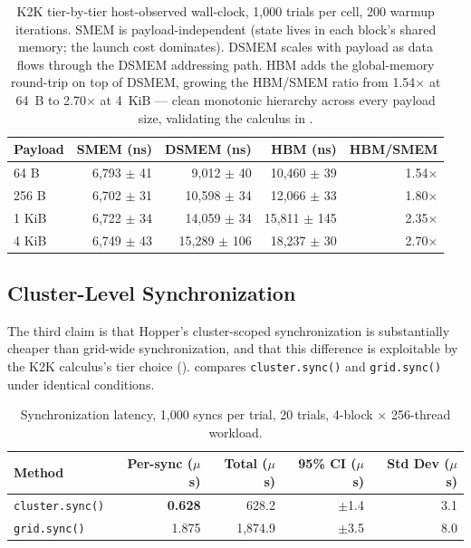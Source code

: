 \begin{table}[htbp]
\centering
\begin{tabular}{lrrrr}
\toprule
Payload & SMEM (ns) & DSMEM (ns) & HBM (ns) & HBM/SMEM \\
\midrule
64 B   & 6{,}793 $\pm$ 41 &  9{,}012 $\pm$ 40 & 10{,}460 $\pm$ 39 & 1.54$\times$ \\
256 B  & 6{,}702 $\pm$ 31 & 10{,}598 $\pm$ 34 & 12{,}066 $\pm$ 33 & 1.80$\times$ \\
1 KiB  & 6{,}722 $\pm$ 34 & 14{,}059 $\pm$ 34 & 15{,}811 $\pm$ 145 & 2.35$\times$ \\
4 KiB  & 6{,}749 $\pm$ 43 & 15{,}289 $\pm$ 106 & 18{,}237 $\pm$ 30 & 2.70$\times$ \\
\bottomrule
\end{tabular}
\caption{K2K tier-by-tier host-observed wall-clock, 1{,}000 trials
per cell, 200 warmup iterations.  SMEM is payload-independent
(state lives in each block's shared memory; the launch cost
dominates).  DSMEM scales with payload as data flows through the
DSMEM addressing path.  HBM adds the global-memory round-trip on
top of DSMEM, growing the HBM/SMEM ratio from 1.54$\times$ at 64~B
to 2.70$\times$ at 4~KiB — clean monotonic hierarchy across every
payload size, validating the calculus in .}
\label{tab:k2k-tier}
\end{table}

\subsection{Cluster-Level Synchronization}
\label{sec:eval:cluster}

The third claim is that Hopper's cluster-scoped synchronization is
substantially cheaper than grid-wide synchronization, and that
this difference is exploitable by the K2K calculus's tier choice
().   compares
\texttt{cluster.sync()} and \texttt{grid.sync()} under identical
conditions.

\begin{table}[htbp]
\centering
\begin{tabular}{lrrrr}
\toprule
Method & Per-sync ($\mu$s) & Total ($\mu$s) & 95\% CI ($\mu$s) & Std Dev ($\mu$s) \\
\midrule
\texttt{cluster.sync()} & \textbf{0.628} & 628.2 & $\pm$1.4 & 3.1 \\
\texttt{grid.sync()}    & 1.875          & 1{,}874.9 & $\pm$3.5 & 8.0 \\
\bottomrule
\end{tabular}
\caption{Synchronization latency, 1{,}000 syncs per trial, 20
trials, 4-block $\times$ 256-thread workload.}
\label{tab:cluster-sync}
\end{table}

